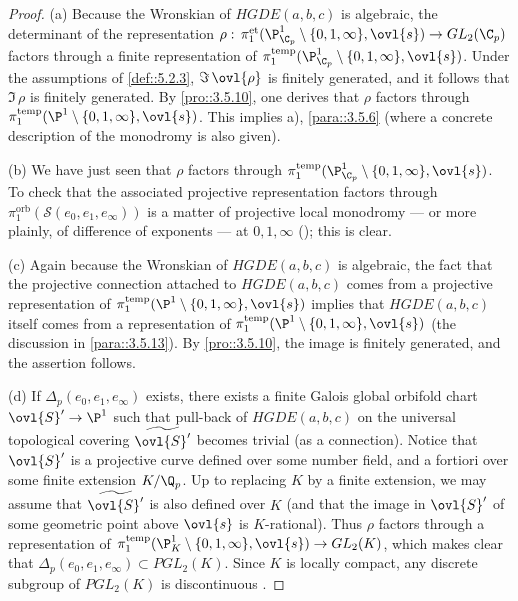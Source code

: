 \begin{proof}
  (a) Because the Wronskian of $ HGDE(a,b,c) $ is algebraic, the
 determinant of the representation  
 $\rho:\,\pi_1^{\mathrm{et}}(\P^1_{\C_p} \setminus
 \{0,1,\infty\},\ovl{s})\to 
 GL_2(\C_p)$ factors through a finite representation of
 $\pi_1^{\mathrm{temp}}(\P^1_{\C_p}\setminus\{0,1,\infty\},\ovl{s})$.
 Under the assumptions of \ref{def::5.2.3}, $\Im\,\ovl{\rho}$ is
 finitely 
 generated, and it follows that $\Im \,\rho$ is finitely generated. By
 \ref{pro::3.5.10}, one derives that $\rho$ factors through
 $\pi_1^{\mathrm{temp}}(\P^1\setminus\{0,1,\infty\},\ovl{s})$. This
 implies a), \cf \ref{para::3.5.6} (where a concrete description
 of the monodromy is 
 also given).

   (b) We have just seen that $\rho$ factors through
 $\pi_1^{\mathrm{temp}}(\P^1_{\C_p}\setminus\{0,1,\infty\},\ovl{s})$. To
 check that the associated projective representation factors through 
 $\pi_1^{\mathrm{orb}}(\mathcal{S}(e_0,e_1,e_\infty))$ is a matter of
 projective local monodromy --- or more plainly, of difference of
 exponents --- at $0,1,\infty$ (); this is clear.

  (c) Again because the Wronskian of $HGDE(a,b,c)$ is algebraic, the
 fact that the projective connection attached to $HGDE(a,b,c)$ comes
 from a projective representation of
 $\pi_1^{\mathrm{temp}}(\P^1\setminus\{0,1,\infty\},\ovl{s})$ implies
 that $ HGDE(a,b,c) $ itself comes from a representation of
 $\pi_1^{\mathrm{temp}}(\P^1\setminus\{0,1,\infty\},\ovl{s})$ (\cf the
 discussion in \ref{para::3.5.13}). By \ref{pro::3.5.10}, the
 image is finitely generated, and 
 the assertion follows.

  (d) If $\Delta_p(e_0,e_1,e_\infty)$ exists, there exists a finite
 Galois global orbifold chart $\ovl{S}'\to \P^1$ such that pull-back of
 $ HGDE(a,b,c) $ on the universal topological covering
 $\widetilde{\ovl{S}'}$ becomes trivial (as a connection). Notice that
 $\ovl{S}'$ is a projective curve defined over some number field, and a
 fortiori over some finite extension $K/\Q_p$.  Up to replacing $K$ by a
 finite extension, we may assume that $\widetilde{\ovl{S}'}$ is also
 defined over $K$ (and that the image in $\ovl{S}'$ of some geometric
 point above $\ovl{s}$ is $K$-rational). Thus $\rho$ factors through a
 representation of
 $\pi_1^{\mathrm{temp}}(\P^1_K\setminus\{0,1,\infty\},\ovl{s})\to
 GL_2(K)$, which makes clear that $\Delta_p(e_0,e_1,e_\infty)\subset
 PGL_2(K)$. Since $K$ is locally compact, any discrete subgroup of
 $PGL_2(K)$ is discontinuous \cite[1.6.4]{sgamc}.
\end{proof}

